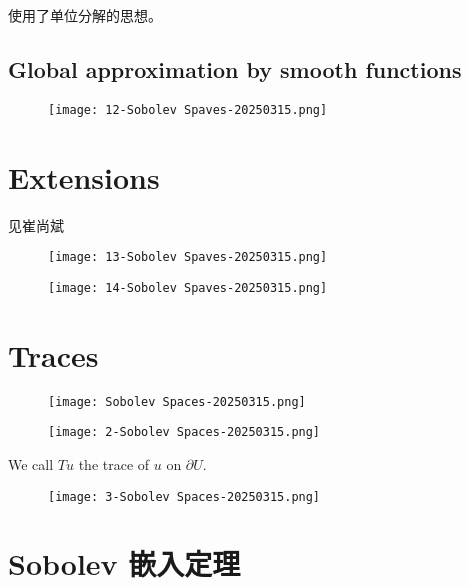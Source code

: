 使用了单位分解的思想。

\subsection{Global approximation by smooth functions}

\begin{figure}[H]
\centering
\texttt{[image: 12-Sobolev Spaves-20250315.png]}
\label{}
\end{figure}

\section{Extensions}

见崔尚斌

\begin{figure}[H]
\centering
\texttt{[image: 13-Sobolev Spaves-20250315.png]}
\label{}
\end{figure}

\begin{figure}[H]
\centering
\texttt{[image: 14-Sobolev Spaves-20250315.png]}
\label{}
\end{figure}

\section{Traces}

\begin{figure}[H]
\centering
\texttt{[image: Sobolev Spaces-20250315.png]}
\label{}
\end{figure}

\begin{theorem}
\begin{figure}[H]
\centering
\texttt{[image: 2-Sobolev Spaces-20250315.png]}
\label{}
\end{figure}
\end{theorem}
\begin{definition}[trace]
We call $Tu$ the trace of $u$ on $\partial U$.
\end{definition}
\begin{figure}[H]
\centering
\texttt{[image: 3-Sobolev Spaces-20250315.png]}
\label{}
\end{figure}

\section{Sobolev 嵌入定理}

